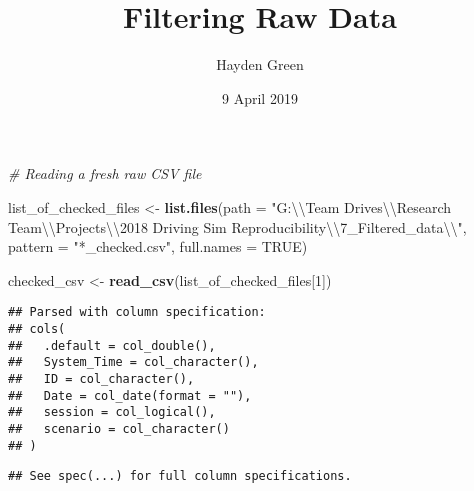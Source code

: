 \documentclass[]{article}
\title{Filtering Raw Data}
\author{Hayden Green}
\date{9 April 2019}
\newenvironment{Shaded}{\begin{snugshade}}{\end{snugshade}}
\newcommand{\CharTok}[1]{\textcolor[rgb]{0.31,0.60,0.02}{#1}}
\newcommand{\CommentTok}[1]{\textcolor[rgb]{0.56,0.35,0.01}{\textit{#1}}}
\newcommand{\DataTypeTok}[1]{\textcolor[rgb]{0.13,0.29,0.53}{#1}}
\newcommand{\DecValTok}[1]{\textcolor[rgb]{0.00,0.00,0.81}{#1}}
\newcommand{\KeywordTok}[1]{\textcolor[rgb]{0.13,0.29,0.53}{\textbf{#1}}}
\newcommand{\NormalTok}[1]{#1}
\newcommand{\OperatorTok}[1]{\textcolor[rgb]{0.81,0.36,0.00}{\textbf{#1}}}
\newcommand{\OtherTok}[1]{\textcolor[rgb]{0.56,0.35,0.01}{#1}}
\newcommand{\StringTok}[1]{\textcolor[rgb]{0.31,0.60,0.02}{#1}}
\begin{document}
\maketitle

\begin{Shaded}
\begin{Highlighting}[]
\CommentTok{# Reading a fresh raw CSV file}

\NormalTok{list_of_checked_files <-}\StringTok{ }\KeywordTok{list.files}\NormalTok{(}\DataTypeTok{path =} \StringTok{"G:}\CharTok{\textbackslash{}\textbackslash{}}\StringTok{Team Drives}\CharTok{\textbackslash{}\textbackslash{}}\StringTok{Research Team}\CharTok{\textbackslash{}\textbackslash{}}\StringTok{Projects}\CharTok{\textbackslash{}\textbackslash{}}\StringTok{2018 Driving Sim Reproducibility}\CharTok{\textbackslash{}\textbackslash{}}\StringTok{7_Filtered_data}\CharTok{\textbackslash{}\textbackslash{}}\StringTok{"}\NormalTok{, }
                                    \DataTypeTok{pattern =} \StringTok{"*_checked.csv"}\NormalTok{, }\DataTypeTok{full.names =} \OtherTok{TRUE}\NormalTok{)}


\NormalTok{checked_csv <-}\StringTok{ }\KeywordTok{read_csv}\NormalTok{(list_of_checked_files[}\DecValTok{1}\NormalTok{])}
\end{Highlighting}
\end{Shaded}

\begin{verbatim}
## Parsed with column specification:
## cols(
##   .default = col_double(),
##   System_Time = col_character(),
##   ID = col_character(),
##   Date = col_date(format = ""),
##   session = col_logical(),
##   scenario = col_character()
## )
\end{verbatim}

\begin{verbatim}
## See spec(...) for full column specifications.
\end{verbatim}

\begin{Shaded}
\end{Shaded}
\end{document}
